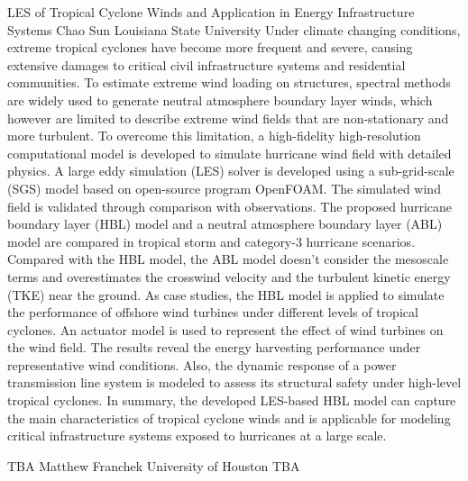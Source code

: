 \begin{addmargin}[2em]{0em}
\vspace{1.5ex}
\abs
{LES of Tropical Cyclone Winds and Application in Energy Infrastructure Systems}
{Chao Sun}
{Louisiana State University}
{Under climate changing conditions, extreme tropical cyclones have become more frequent and severe, causing extensive damages to critical civil infrastructure systems and residential communities. To estimate extreme wind loading on structures, spectral methods are widely used to generate neutral atmosphere boundary layer winds, which however are limited to describe extreme wind fields that are non-stationary and more turbulent. To overcome this limitation, a high-fidelity high-resolution computational model is developed to simulate hurricane wind field with detailed physics. A large eddy simulation (LES) solver is developed using a sub-grid-scale (SGS) model based on open-source program OpenFOAM. The simulated wind field is validated through comparison with observations. The proposed hurricane boundary layer (HBL) model and a neutral atmosphere boundary layer (ABL) model are compared in tropical storm and category-3 hurricane scenarios. Compared with the HBL model, the ABL model doesn’t consider the mesoscale terms and overestimates the crosswind velocity and the turbulent kinetic energy (TKE) near the ground. As case studies, the HBL model is applied to simulate the performance of offshore wind turbines under different levels of tropical cyclones. An actuator model is used to represent the effect of wind turbines on the wind field. The results reveal the energy harvesting performance under representative wind conditions. Also, the dynamic response of a power transmission line system is modeled to assess its structural safety under high-level tropical cyclones. In summary, the developed LES-based HBL model can capture the main characteristics of tropical cyclone winds and is applicable for modeling critical infrastructure systems exposed to hurricanes at a large scale.}

\vspace{1.5ex}
\abs
{TBA}
{Matthew Franchek}
{University of Houston}
{TBA}



\end{addmargin}
